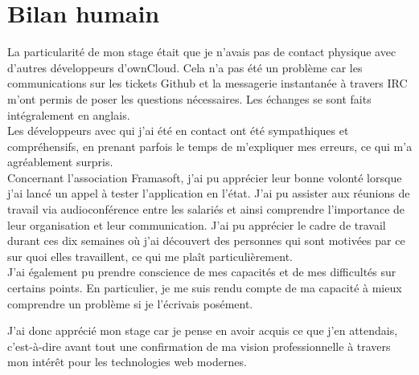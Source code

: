 \documentclass[10pt,a4paper, twoside]{report}
\begin{document}
	\section{Bilan humain}
	La particularité de mon stage était que je n'avais pas de contact physique avec d'autres développeurs d'ownCloud. Cela n'a pas été un problème car les communications sur les tickets Github et la messagerie instantanée à travers IRC m'ont permis de poser les questions nécessaires. Les échanges se sont faits intégralement en anglais.
	\\
	
	Les développeurs avec qui j'ai été en contact ont été sympathiques et compréhensifs, en prenant parfois le temps de m'expliquer mes erreurs, ce qui m'a agréablement surpris.
	\\
	
	Concernant l'association Framasoft, j'ai pu apprécier leur bonne volonté lorsque j'ai lancé un appel à tester l'application en l'état. J'ai pu assister aux réunions de travail via audioconférence entre les salariés et ainsi comprendre l'importance de leur organisation et leur communication.	
	J'ai pu apprécier le cadre de travail durant ces dix semaines où j'ai découvert des personnes qui sont motivées par ce sur quoi elles travaillent, ce qui me plaît particulièrement. 
	\\
	
	J'ai également pu prendre conscience de mes capacités et de mes difficultés sur certains points. En particulier, je me suis rendu compte de ma capacité à mieux comprendre un problème si je l'écrivais posément.
	
	J'ai donc apprécié mon stage car je pense en avoir acquis ce que j'en attendais, c'est-à-dire avant tout une confirmation de ma vision professionnelle à travers mon intérêt pour les technologies web modernes.
	
\end{document}
